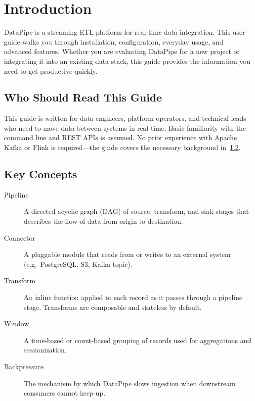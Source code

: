 \documentclass[
    language=english,
    doctype=manual,
    institution=none,
    titlestyle=book,
    oneside,
]{../../omnilatex}
\begin{document}
\maketitle

\tableofcontents

\chapter{Introduction}
\label{sec:introduction}

DataPipe is a streaming ETL platform for real-time data integration. This
user guide walks you through installation, configuration, everyday usage,
and advanced features. Whether you are evaluating DataPipe for a new project
or integrating it into an existing data stack, this guide provides the
information you need to get productive quickly.

\section{Who Should Read This Guide}

This guide is written for data engineers, platform operators, and
technical leads who need to move data between systems in real time.
Basic familiarity with the command line and REST APIs is assumed. No
prior experience with Apache Kafka or Flink is required---the guide
covers the necessary background in~\cref{sec:concepts}.

\section{Key Concepts}
\label{sec:concepts}

\begin{description}
    \item[Pipeline] A directed acyclic graph (DAG) of source, transform,
        and sink stages that describes the flow of data from origin to
        destination.
    \item[Connector] A pluggable module that reads from or writes to an
        external system (e.g.\ PostgreSQL, S3, Kafka topic).
    \item[Transform] An inline function applied to each record as it
        passes through a pipeline stage. Transforms are composable and
        stateless by default.
    \item[Window] A time-based or count-based grouping of records used
        for aggregations and sessionization.
    \item[Backpressure] The mechanism by which DataPipe slows ingestion
        when downstream consumers cannot keep up.
\end{description}
\end{document}
